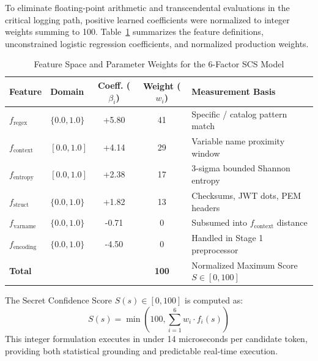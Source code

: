 \documentclass[conference]{IEEEtran}
\begin{document}
To eliminate floating-point arithmetic and transcendental evaluations in the critical logging path, positive learned coefficients were normalized to integer weights summing to 100. Table~\ref{tab:weights} summarizes the feature definitions, unconstrained logistic regression coefficients, and normalized production weights.

\begin{table}[t]
\caption{Feature Space and Parameter Weights for the 6-Factor SCS Model}
\label{tab:weights}
\centering
\footnotesize
\setlength{\tabcolsep}{2.5pt}
\begin{tabularx}{\linewidth}{llccX}
\toprule
\textbf{Feature} & \textbf{Domain} & \textbf{Coeff. ($\beta_i$)} & \textbf{Weight ($w_i$)} & \textbf{Measurement Basis} \\
\midrule
$f_{\text{regex}}$ & $\{0.0, 1.0\}$ & +5.80 & 41 & Specific / catalog pattern match \\
$f_{\text{context}}$ & $[0.0, 1.0]$ & +4.14 & 29 & Variable name proximity window \\
$f_{\text{entropy}}$ & $[0.0, 1.0]$ & +2.38 & 17 & 3-sigma bounded Shannon entropy \\
$f_{\text{struct}}$ & $\{0.0, 1.0\}$ & +1.82 & 13 & Checksums, JWT dots, PEM headers \\
$f_{\text{varname}}$ & $\{0.0, 1.0\}$ & -0.71 & 0 & Subsumed into $f_{\text{context}}$ distance \\
$f_{\text{encoding}}$ & $\{0.0, 1.0\}$ & -4.50 & 0 & Handled in Stage 1 preprocessor \\
\midrule
\textbf{Total} & & & \textbf{100} & Normalized Maximum Score $S \in [0, 100]$ \\
\bottomrule
\end{tabularx}
\end{table}

The Secret Confidence Score $S(s) \in [0, 100]$ is computed as:
\begin{equation}
    S(s) = \min\left(100, \sum_{i=1}^{6} w_i \cdot f_i(s)\right)
\end{equation}
This integer formulation executes in under 14 microseconds per candidate token, providing both statistical grounding and predictable real-time execution.
\end{document}

